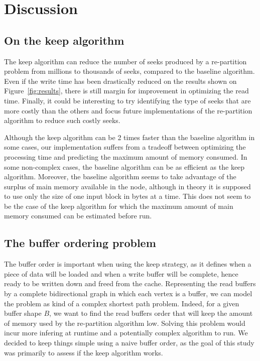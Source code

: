 \documentclass[conference]{IEEEtran}
\begin{document}
\section{Discussion}

\subsection{On the keep algorithm}
The keep algorithm can reduce the number of seeks produced by a re-partition
problem from millions to thousands of seeks, compared to the baseline algorithm.
Even if the write time has been drastically reduced on the results shown on
Figure~\ref{fig:results}, there is still margin for improvement in optimizing
the read time.
Finally, it could be interesting to try identifying the type of seeks that are
more costly than the others and focus future implementations of the re-partition
algorithm to reduce such costly seeks.

Although the keep algorithm can be 2 times faster than the baseline algorithm
in some cases, our implementation suffers from a tradeoff between optimizing
the processing time and predicting the maximum amount of memory consumed.
In some non-complex cases, the baseline algorithm can be as efficient as the
keep algorithm.
Moreover, the baseline algorithm seems to take advantage of the surplus of
main memory available in the node, although in theory it is supposed to use
only the size of one input block in bytes at a time.
This does not seem to be the case of the keep algorithm for which the maximum
amount of main memory consumed can be estimated before run.

\subsection{The buffer ordering problem}
The buffer order is important when using the keep strategy, as it defines when
a piece of data will be loaded and when a write buffer will be complete, hence
ready to be written down and freed from the cache.
Representing the read buffers by a complete bidirectional graph in which each
vertex is a buffer, we can model the problem as kind of a complex shortest path
problem.
Indeed, for a given buffer shape $B$, we want to find the read buffers order
that will keep the amount of memory used by the re-partition algorithm low.
Solving this problem would incur more infering at runtime and a potentially
complex algorithm to run.
We decided to keep things simple using a naive buffer order, as the goal of
this study was primarily to assess if the keep algorithm works.
\end{document}

